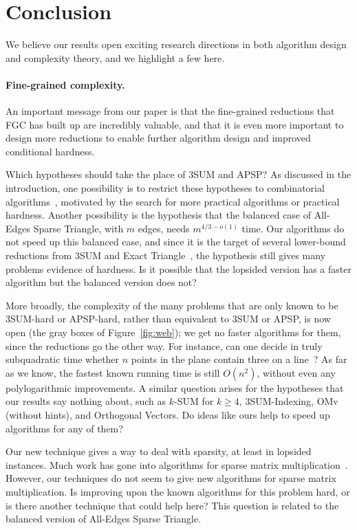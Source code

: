 \section{Conclusion}\label{sec:conclusion}

We believe our results open exciting research directions in both algorithm design and complexity theory, and we highlight a few here.

\paragraph{Fine-grained complexity.}
An important message from our paper is that the fine-grained reductions that FGC has built up are incredibly valuable, and that it is even more important to design more reductions to enable further algorithm design and improved conditional hardness.

{ Which hypotheses should take the place of $3$SUM and APSP?} As discussed in the introduction, one possibility is to restrict these hypotheses to combinatorial algorithms~\cite{VW10,VW18,AV14}, motivated by the search for more practical algorithms or practical hardness.
 Another possibility is the hypothesis that the balanced case of All-Edges Sparse Triangle, with $m$ edges, needs $m^{4/3-o(1)}$ time. Our algorithms do not speed up this balanced case, and since it is the target of several lower-bound reductions from $3$SUM and Exact Triangle~\cite{Pat10,KPP16,VX20a,CX24}, the hypothesis still gives many problems evidence of hardness. Is it possible that the lopsided version has a faster algorithm but the balanced version does not? 

More broadly, the complexity of the many problems that are only known to be 3SUM-hard or APSP-hard, rather than equivalent to $3$SUM or APSP, is now open (the gray boxes of Figure~\ref{fig:web}); we get no faster algorithms for them, since the reductions go the other way. For instance, can one decide in truly subquadratic time whether $n$ points in the plane contain three on a line~\cite{GO95}? As far as we know, the fastest known running time is still $O(n^2)$, without even any polylogarithmic improvements.  A similar question arises for the hypotheses that our results say nothing about, such as $k$-SUM for $k\ge4$, 3SUM-Indexing, OMv (without hints), and Orthogonal Vectors. Do ideas like ours help to speed up algorithms for any of them?

Our new technique gives a way to deal with sparsity, at least in lopsided instances. Much work has gone into algorithms for sparse matrix multiplication~\cite{YZ05,AP09,PS14,ABFK24,BGGW25,BFN26,Gra26}. However, our techniques do not seem to give new algorithms for sparse matrix multiplication. Is improving upon the known algorithms for this problem hard, or is there another technique that could help here? This question is related to the balanced version of All-Edges Sparse Triangle.

